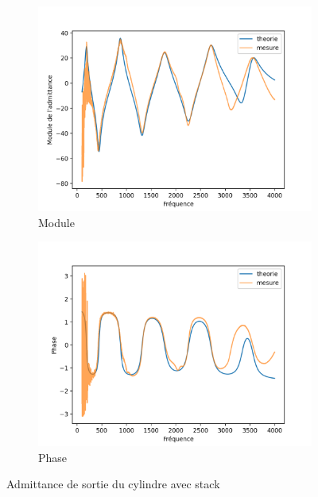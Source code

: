 \documentclass[atiam, article]{rapport} %
\begin{document}
\begin{figure}[H]
  \centering
  \begin{subfigure}[b]{.45\textwidth}
    \centering
    \includegraphics[width=\textwidth]{vents/images_vents/admittance_cylindre+stack_amp.png}
    \caption{Module}
    \label{subfig:admittance_cylindre+stack_amp}
  \end{subfigure}
  \begin{subfigure}[b]{.45\textwidth}
    \centering
    \includegraphics[width=\textwidth]{vents/images_vents/admittance_cylindre+stack_phase.png}
    \caption{Phase}
    \label{subfig:admittance_cylindre+stack_phase}
  \end{subfigure}
  \caption{Admittance de sortie du cylindre avec stack}
  \label{fig:admittance_cyl_stack}
\end{figure}
\end{document}
